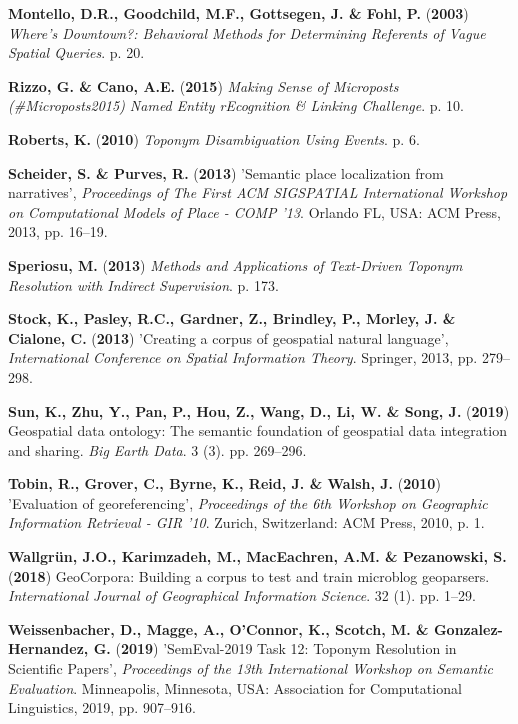 \documentclass[10pt,]{article}
\newenvironment{cslreferences}%
  {}%
  {\par}
\begin{document}
\begin{cslreferences}
\leavevmode\hypertarget{ref-montello2003}{}%
\textbf{Montello, D.R., Goodchild, M.F., Gottsegen, J. \& Fohl, P.}
(\textbf{2003}) \emph{Where's Downtown?: Behavioral Methods for
Determining Referents of Vague Spatial Queries}. p. 20.

\leavevmode\hypertarget{ref-rizzo2015}{}%
\textbf{Rizzo, G. \& Cano, A.E.} (\textbf{2015}) \emph{Making Sense of
Microposts (\#Microposts2015) Named Entity rEcognition \& Linking
Challenge}. p. 10.

\leavevmode\hypertarget{ref-roberts2010}{}%
\textbf{Roberts, K.} (\textbf{2010}) \emph{Toponym Disambiguation Using
Events}. p. 6.

\leavevmode\hypertarget{ref-scheider2013}{}%
\textbf{Scheider, S. \& Purves, R.} (\textbf{2013}) 'Semantic place
localization from narratives', \emph{Proceedings of The First ACM
SIGSPATIAL International Workshop on Computational Models of Place -
COMP '13}. Orlando FL, USA: ACM Press, 2013, pp. 16--19.

\leavevmode\hypertarget{ref-speriosu2013}{}%
\textbf{Speriosu, M.} (\textbf{2013}) \emph{Methods and Applications of
Text-Driven Toponym Resolution with Indirect Supervision}. p. 173.

\leavevmode\hypertarget{ref-stock2013}{}%
\textbf{Stock, K., Pasley, R.C., Gardner, Z., Brindley, P., Morley, J.
\& Cialone, C.} (\textbf{2013}) 'Creating a corpus of geospatial natural
language', \emph{International Conference on Spatial Information
Theory}. Springer, 2013, pp. 279--298.

\leavevmode\hypertarget{ref-sun2019a}{}%
\textbf{Sun, K., Zhu, Y., Pan, P., Hou, Z., Wang, D., Li, W. \& Song,
J.} (\textbf{2019}) Geospatial data ontology: The semantic foundation of
geospatial data integration and sharing. \emph{Big Earth Data}. 3 (3).
pp. 269--296.

\leavevmode\hypertarget{ref-tobin2010}{}%
\textbf{Tobin, R., Grover, C., Byrne, K., Reid, J. \& Walsh, J.}
(\textbf{2010}) 'Evaluation of georeferencing', \emph{Proceedings of the
6th Workshop on Geographic Information Retrieval - GIR '10}. Zurich,
Switzerland: ACM Press, 2010, p. 1.

\leavevmode\hypertarget{ref-wallgrun2018}{}%
\textbf{Wallgrün, J.O., Karimzadeh, M., MacEachren, A.M. \& Pezanowski,
S.} (\textbf{2018}) GeoCorpora: Building a corpus to test and train
microblog geoparsers. \emph{International Journal of Geographical
Information Science}. 32 (1). pp. 1--29.

\leavevmode\hypertarget{ref-weissenbacher2019}{}%
\textbf{Weissenbacher, D., Magge, A., O'Connor, K., Scotch, M. \&
Gonzalez-Hernandez, G.} (\textbf{2019}) 'SemEval-2019 Task 12: Toponym
Resolution in Scientific Papers', \emph{Proceedings of the 13th
International Workshop on Semantic Evaluation}. Minneapolis, Minnesota,
USA: Association for Computational Linguistics, 2019, pp. 907--916.


\end{cslreferences}
\end{document}
